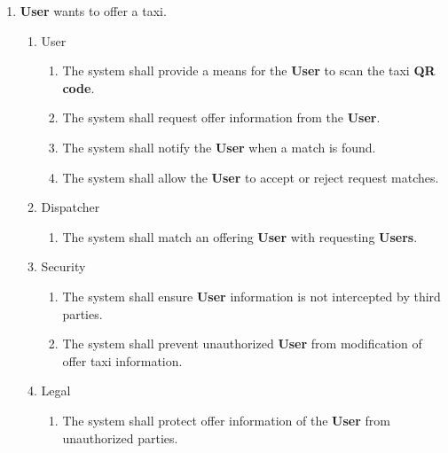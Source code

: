 \documentclass[english]{article}
\begin{document}
\begin{enumerate}[{BE}1.]
	\item \textbf{User} wants to offer a taxi.	
	\begin{enumerate}[{VP4}.1]
		\item User
			\begin{enumerate}
				\item The system shall provide a means for the \textbf{User} to scan the taxi \textbf{QR code}.
				\item The system shall request offer information from the \textbf{User}.
				\item The system shall notify the \textbf{User} when a match is found.
				\item The system shall allow the \textbf{User} to accept or reject request matches. 
			\end{enumerate}
		\item Dispatcher
			\begin{enumerate}
				\item The system shall match an offering \textbf{User} with requesting \textbf{Users}.
			\end{enumerate}
		\item Security
			\begin{enumerate}
			\item The system shall ensure \textbf{User} information is not intercepted by third parties.
			\item The system shall prevent unauthorized \textbf{User} from modification of offer taxi information. 
			\end{enumerate}
		\item Legal
			\begin{enumerate}
				\item The system shall protect offer information of the \textbf{User} from unauthorized parties.
			\end{enumerate}
	\end{enumerate}


\end{enumerate}
\end{document}

